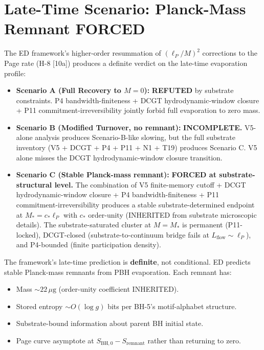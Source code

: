 \documentclass[11pt,a4paper]{article}
\begin{document}
\section{Late-Time Scenario: Planck-Mass Remnant FORCED}

The ED framework's higher-order resummation of $(\ell_P/M)^2$ corrections to the Page rate (H-8 [10a]) produces a definite verdict on the late-time evaporation profile:

\begin{itemize}[noitemsep]
  \item \textbf{Scenario A (Full Recovery to $M = 0$):} \textbf{REFUTED} by substrate constraints. P4 bandwidth-finiteness + DCGT hydrodynamic-window closure + P11 commitment-irreversibility jointly forbid full evaporation to zero mass.
  \item \textbf{Scenario B (Modified Turnover, no remnant):} \textbf{INCOMPLETE.} V5-alone analysis produces Scenario-B-like slowing, but the full substrate inventory (V5 + DCGT + P4 + P11 + N1 + T19) produces Scenario C. V5 alone misses the DCGT hydrodynamic-window closure transition.
  \item \textbf{Scenario C (Stable Planck-mass remnant):} \textbf{FORCED at substrate-structural level.} The combination of V5 finite-memory cutoff + DCGT hydrodynamic-window closure + P4 bandwidth-finiteness + P11 commitment-irreversibility produces a stable substrate-determined endpoint at $M_* = c_*\ell_P$ with $c_*$ order-unity (INHERITED from substrate microscopic details). The substrate-saturated cluster at $M = M_*$ is permanent (P11-locked), DCGT-closed (substrate-to-continuum bridge fails at $L_{\mathrm{flow}} \sim \ell_P$), and P4-bounded (finite participation density).
\end{itemize}

The framework's late-time prediction is \textbf{definite}, not conditional. ED predicts stable Planck-mass remnants from PBH evaporation. Each remnant has:
\begin{itemize}[noitemsep]
  \item Mass $\sim 22\,\mu\mathrm{g}$ (order-unity coefficient INHERITED).
  \item Stored entropy $\sim O(\log g)$ bits per BH-5's motif-alphabet structure.
  \item Substrate-bound information about parent BH initial state.
  \item Page curve asymptote at $S_{\mathrm{BH,0}} - S_{\mathrm{remnant}}$ rather than returning to zero.
\end{itemize}
\end{document}
